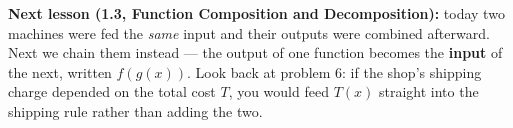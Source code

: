 \documentclass[10pt]{article}
\begin{document}
\vspace{0.08in}

\boxguard[8]
\begin{spiralbox}
\small
\textbf{Next lesson (1.3, Function Composition and Decomposition):} today two machines were fed
the \emph{same} input and their outputs were combined afterward. Next we chain them instead ---
the output of one function becomes the \textbf{input} of the next, written $f(g(x))$. Look back
at problem 6: if the shop's shipping charge depended on the total cost $T$, you would feed
$T(x)$ straight into the shipping rule rather than adding the two.
\end{spiralbox}
\end{document}
